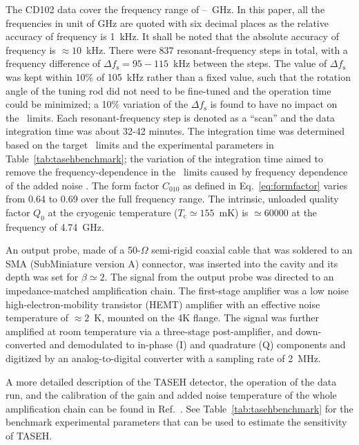 The CD102 data cover the frequency range of \flo--\fhi~GHz. In this paper, 
all the frequencies in unit of GHz are quoted with six decimal places as the 
relative accuracy of frequency is 1~kHz. It shall be noted that the 
absolute accuracy of frequency is $\approx 10$~kHz.  
There were 837 resonant-frequency steps in total, with a frequency difference 
of $\Delta f_\text{s}=95-115$~kHz between the steps. The value of 
$\Delta f_\text{s}$ was kept within 10\% of 105~kHz rather than 
a fixed value, such that the rotation angle of the tuning rod did not need to 
be fine-tuned and the operation time could be minimized; a 10\% variation of 
the $\Delta f_\text{s}$ is found to have no impact on the \gagg\ limits. 
Each resonant-frequency step is denoted as a ``scan'' 
and the data integration time was about 32-42 minutes. The integration 
time was determined based on the target \gagg\ limits and the experimental 
parameters in Table~\ref{tab:tasehbenchmark}; the variation of the integration 
time aimed to remove the frequency-dependence in the \gagg\ limits caused by   
frequency dependence of the added noise \ta. The form factor $C_{010}$ as 
defined in Eq.~\eqref{eq:formfactor} varies from 0.64 to 0.69 over the 
full frequency range.  
The intrinsic, unloaded quality factor $Q_0$ at the cryogenic temperature 
($T_\mathrm{c}\simeq 155$~mK) is $\simeq 60000$ at the frequency of 
4.74~GHz.

An output probe, made of a 50-$\Omega$ semi-rigid coaxial cable that was 
soldered to an SMA (SubMiniature version A) connector, was inserted into the 
cavity and its depth was set for 
$\beta\simeq2$.  The signal from the output probe was directed to an 
impedance-matched amplification chain. The first-stage amplifier was 
a low noise high-electron-mobility transistor (HEMT) amplifier with an 
effective noise temperature of $\approx 2$~K, mounted on the 4K flange. 
The signal was further amplified at room temperature via a 
three-stage post-amplifier, and down-converted 
and demodulated to in-phase (I) and quadrature (Q) components and digitized 
by an analog-to-digital converter with a sampling rate of 2~MHz. 

A more detailed description of the TASEH detector, the operation of the 
data run, and the calibration of the gain and added noise temperature of the 
whole amplification chain can be found in Ref.~\cite{TASEHInstrumentation}. 
See Table~\ref{tab:tasehbenchmark} for the benchmark experimental parameters 
that can be used to estimate the sensitivity of TASEH. 


